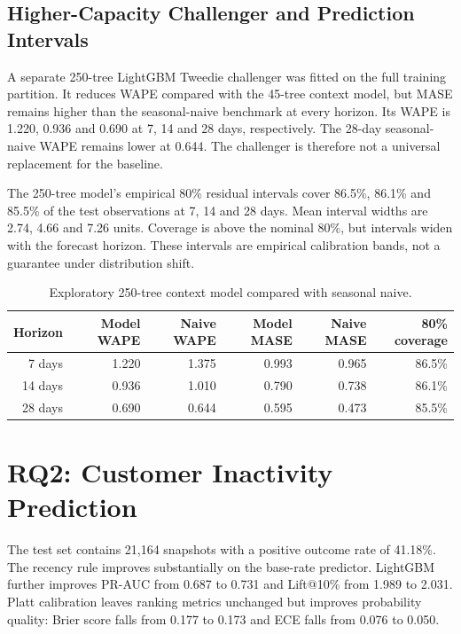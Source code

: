 \subsection{Higher-Capacity Challenger and Prediction Intervals}
A separate 250-tree LightGBM Tweedie challenger was fitted on the full training partition. It reduces WAPE compared with the 45-tree context model, but MASE remains higher than the seasonal-naive benchmark at every horizon. Its WAPE is 1.220, 0.936 and 0.690 at 7, 14 and 28 days, respectively. The 28-day seasonal-naive WAPE remains lower at 0.644. The challenger is therefore not a universal replacement for the baseline.

The 250-tree model's empirical 80\% residual intervals cover 86.5\%, 86.1\% and 85.5\% of the test observations at 7, 14 and 28 days. Mean interval widths are 2.74, 4.66 and 7.26 units. Coverage is above the nominal 80\%, but intervals widen with the forecast horizon. These intervals are empirical calibration bands, not a guarantee under distribution shift.

\begin{table}[htbp]
\centering
\small
\begin{tabular}{rrrrrr}
\toprule
\textbf{Horizon} & \textbf{Model WAPE} & \textbf{Naive WAPE} & \textbf{Model MASE} & \textbf{Naive MASE} & \textbf{80\% coverage}\\
\midrule
7 days & 1.220 & 1.375 & 0.993 & 0.965 & 86.5\%\\
14 days & 0.936 & 1.010 & 0.790 & 0.738 & 86.1\%\\
28 days & 0.690 & 0.644 & 0.595 & 0.473 & 85.5\%\\
\bottomrule
\end{tabular}
\caption{Exploratory 250-tree context model compared with seasonal naive.}
\label{tab:rq1_challenger}
\end{table}

\section{RQ2: Customer Inactivity Prediction}
The test set contains 21,164 snapshots with a positive outcome rate of 41.18\%. The recency rule improves substantially on the base-rate predictor. LightGBM further improves PR-AUC from 0.687 to 0.731 and Lift@10\% from 1.989 to 2.031. Platt calibration leaves ranking metrics unchanged but improves probability quality: Brier score falls from 0.177 to 0.173 and ECE falls from 0.076 to 0.050.

